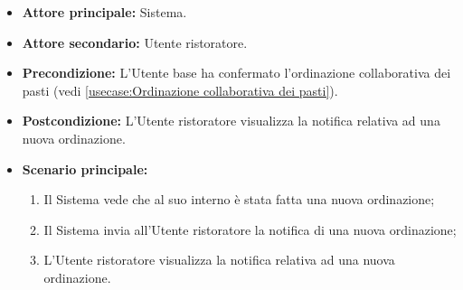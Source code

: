 \label{usecase:Visualizzazione notifica nuovo ordine}
\begin{itemize}
	\item \textbf{Attore principale:} Sistema.

	\item \textbf{Attore secondario:} Utente ristoratore.

	\item \textbf{Precondizione:} L'Utente base ha confermato l'ordinazione collaborativa dei pasti (vedi \autoref{usecase:Ordinazione collaborativa dei pasti}).

	\item \textbf{Postcondizione:} L'Utente ristoratore visualizza la notifica relativa ad una nuova ordinazione.

	\item \textbf{Scenario principale:}
	      \begin{enumerate}
		      \item Il Sistema vede che al suo interno è stata fatta una nuova ordinazione;
		      \item Il Sistema invia all'Utente ristoratore la notifica di una nuova ordinazione;
		      \item L'Utente ristoratore visualizza la notifica relativa ad una nuova ordinazione.
	      \end{enumerate}
\end{itemize}

